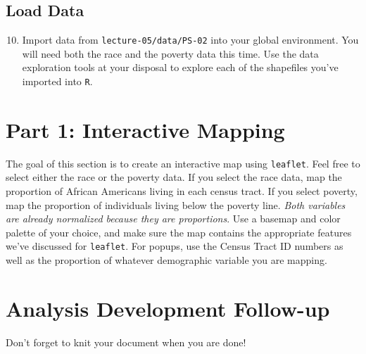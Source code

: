 \documentclass{tufte-handout}
\begin{document}
\vspace{3mm}
\subsection{Load Data}
\begin{enumerate}[label=\alph*.]
\setcounter{enumi}{9}
\item Import data from \texttt{lecture-05/data/PS-02} into your global environment. You will need both the race and the poverty data this time. Use the data exploration tools at your disposal to explore each of the shapefiles you've imported into \texttt{R}.
\end{enumerate}

\vspace{5mm}
\section{Part 1: Interactive Mapping}
The goal of this section is to create an interactive map using \texttt{leaflet}. Feel free to select either the race or the poverty data. If you select the race data, map the proportion of African Americans living in each census tract. If you select poverty, map the proportion of individuals living below the poverty line. \textit{Both variables are already normalized because they are proportions}. Use a basemap and color palette of your choice, and make sure the map contains the appropriate features we've discussed for \texttt{leaflet}. For popups, use the Census Tract ID numbers as well as the proportion of whatever demographic variable you are mapping.

\vspace{5mm}
\section{Analysis Development Follow-up}
Don't forget to knit your document when you are done!

\end{document}
